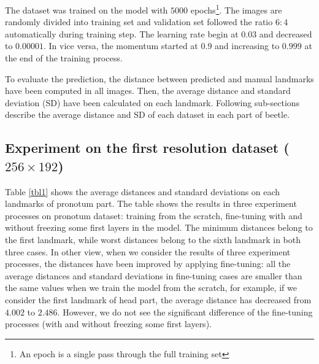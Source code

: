 \documentclass[12pt,a4paper]{article}
\begin{document}
The dataset was trained on the model with $5000$ epochs\footnote{An epoch is a single pass through the full training set}. The images are randomly divided into training set and validation set followed the ratio $6:4$ automatically during training step. The learning rate begin at $0.03$ and decreased to $0.00001$. In vice versa, the momentum started at $0.9$ and increasing to $0.999$ at the end of the training process. 

To evaluate the prediction, the distance between predicted and manual landmarks have been computed in all images. Then, the average distance and standard deviation (SD) have been calculated on each landmark. Following sub-sections describe the average distance and SD of each dataset in each part of beetle.
\subsection{Experiment on the first resolution dataset ($256 \times 192$) }
Table \ref{tbl1} shows the average distances and standard deviations on each landmarks of pronotum part. The table shows the results in three experiment processes on pronotum dataset: training from the scratch, fine-tuning with and without freezing some first layers in the model. The minimum distances belong to the first landmark, while worst distances belong to the sixth landmark in both three cases. In other view, when we consider the results of three experiment processes, the distances have been improved by applying fine-tuning: all the average distances and standard deviations in fine-tuning cases are smaller than the same values when we train the model from the scratch,  for example, if we consider the first landmark of head part, the average distance has decreased from $4.002$ to $2.486$. However, we do not see the significant difference  of the fine-tuning processes (with and without freezing some first layers).
\end{document}
